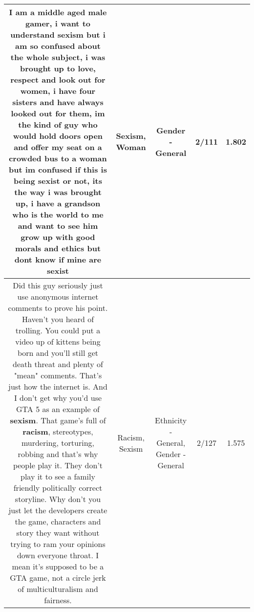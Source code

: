 \documentclass[11pt]{article}
\newlength\mylength
\begin{document}
\begin{center}
\begin{longtable}{|C{.65\mylength}|C{.30\mylength}|C{.12\mylength}|C{.12\mylength}|C{.12\mylength}|}
  \small I am a middle aged male gamer, i want to understand \textbf{sexism} but i am so confused about the whole subject, i was brought up to love, respect and look out for women, i have four sisters and have always looked out for them, im the kind of guy who would hold doors open and offer my seat on a crowded bus to a \textbf{woman} but im confused if this is being sexist or not, its the way i was brought up, i have a grandson who is the world to me and want to see him grow up with good morals and ethics but dont know if mine are sexist\normalsize   & Sexism, Woman & Gender - General & 2/111 & 1.802 \\  \hline
  \small Did this guy seriously just use anonymous internet comments to prove his point. Haven't you heard of trolling. You could put a video up of kittens being born and you'll still get death threat and plenty of "mean" comments. That's just how the internet is. And I don't get why you'd use GTA 5 as an example of \textbf{sexism}. That game's full of \textbf{racism}, stereotypes, murdering, torturing, robbing and that's why people play it. They don't play it to see a family friendly politically correct storyline. Why don't you just let the developers create the game, characters and story they want without trying to ram your opinions down everyone throat. I mean it's supposed to be a GTA game, not a circle jerk of multiculturalism and fairness.\normalsize   & Racism, Sexism & Ethnicity - General, Gender - General & 2/127 & 1.575 \\  \hline

\end{longtable}
\end{center}
\end{document}
